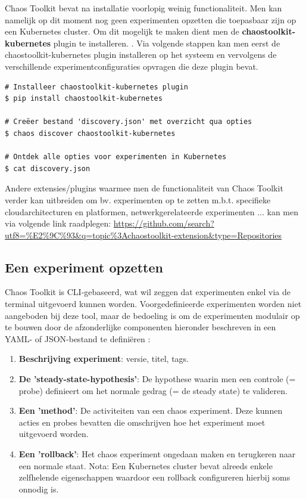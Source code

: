 Chaos Toolkit bevat na installatie voorlopig weinig functionaliteit. Men kan namelijk op dit moment nog geen experimenten opzetten die toepasbaar zijn op een Kubernetes cluster. Om dit mogelijk te maken dient men de {\bf chaostoolkit-kubernetes} plugin te installeren. \autocite{ChaosToolkit2022}. 
Via volgende stappen kan men eerst de chaostoolkit-kubernetes plugin installeren op het systeem en vervolgens de verschillende experimentconfiguraties opvragen die deze plugin bevat.
\begin{lstlisting} 
# Installeer chaostoolkit-kubernetes plugin
$ pip install chaostoolkit-kubernetes

# Creëer bestand 'discovery.json' met overzicht qua opties
$ chaos discover chaostoolkit-kubernetes

# Ontdek alle opties voor experimenten in Kubernetes
$ cat discovery.json
\end{lstlisting}

Andere extensies/plugins waarmee men de functionaliteit van Chaos Toolkit verder kan uitbreiden om bv. experimenten op te zetten m.b.t. specifieke cloudarchitecturen en platformen, netwerkgerelateerde experimenten ... kan men via volgende link raadplegen: \url{https://github.com/search?utf8=%E2%9C%93&q=topic%3Achaostoolkit-extension&type=Repositories} 

\subsection{Een experiment opzetten}

Chaos Toolkit is CLI-gebaseerd, wat wil zeggen dat experimenten enkel via de terminal uitgevoerd kunnen worden. Voorgedefinieerde experimenten worden niet aangeboden bij deze tool, maar de bedoeling is om de experimenten modulair op te bouwen door de afzonderlijke componenten hieronder beschreven in een YAML- of JSON-bestand te definiëren \autocite{ChaosToolkit2022a}:
\begin{enumerate}
    \item {\bf Beschrijving experiment}: versie, titel, tags.
    \item {\bf De 'steady-state-hypothesis'}: De hypothese waarin men een controle (= probe) definieert om het normale gedrag (= de steady state) te valideren.
    \item {\bf Een 'method'}: De activiteiten van een chaos experiment. Deze kunnen acties en probes bevatten die omschrijven hoe het experiment moet uitgevoerd worden.  
    \item {\bf Een 'rollback'}: Het chaos experiment ongedaan maken en terugkeren naar een normale staat. Nota: Een Kubernetes cluster bevat alreeds enkele zelfhelende eigenschappen waardoor een rollback configureren hierbij soms onnodig is.
\end{enumerate}
    
